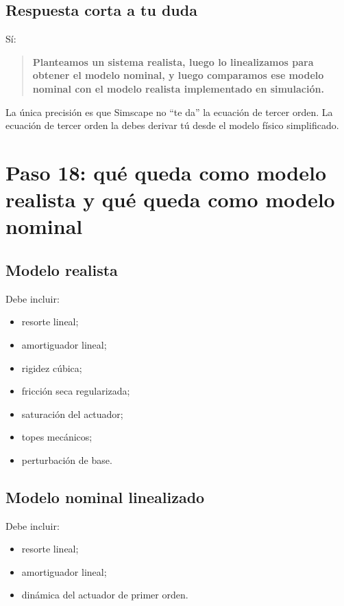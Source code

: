 \documentclass[11pt]{article}
\begin{document}
\subsection{Respuesta corta a tu duda}

S\'i:

\begin{quote}
\textbf{Planteamos un sistema realista, luego lo linealizamos para obtener el modelo nominal, y luego comparamos ese modelo nominal con el modelo realista implementado en simulaci\'on.}
\end{quote}

La \'unica precisi\'on es que Simscape no ``te da'' la ecuaci\'on de tercer orden. La ecuaci\'on de tercer orden la debes derivar t\'u desde el modelo f\'isico simplificado.

\section{Paso 18: qu\'e queda como modelo realista y qu\'e queda como modelo nominal}

\subsection{Modelo realista}

Debe incluir:

\begin{itemize}[leftmargin=1.2cm]
\item resorte lineal;
\item amortiguador lineal;
\item rigidez c\'ubica;
\item fricci\'on seca regularizada;
\item saturaci\'on del actuador;
\item topes mec\'anicos;
\item perturbaci\'on de base.
\end{itemize}

\subsection{Modelo nominal linealizado}

Debe incluir:

\begin{itemize}[leftmargin=1.2cm]
\item resorte lineal;
\item amortiguador lineal;
\item din\'amica del actuador de primer orden.
\end{itemize}
\end{document}
